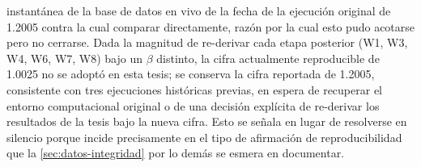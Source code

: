 instantánea de la base de datos en vivo de la fecha de la ejecución original de
\num{1.2005} contra la cual comparar directamente, razón por la cual esto pudo acotarse
pero no cerrarse. Dada la magnitud de re-derivar cada etapa posterior (W1, W3, W4, W6,
W7, W8) bajo un $\beta$ distinto, la cifra actualmente reproducible de \num{1.0025} no
se adoptó en esta tesis; se conserva la cifra reportada de \num{1.2005}, consistente con
tres ejecuciones históricas previas, en espera de recuperar el entorno computacional
original o de una decisión explícita de re-derivar los resultados de la tesis bajo la
nueva cifra. Esto se señala en lugar de resolverse en silencio porque incide
precisamente en el tipo de afirmación de reproducibilidad que la \cref{sec:datos-integridad}
por lo demás se esmera en documentar.
